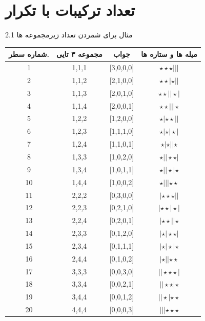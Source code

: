 \documentclass[12pt]{article}
\begin{document}
\section{تعداد ترکیبات با تکرار}
{\large  2.1 مثال برای شمردن تعداد زیرمجموعه ها}

\begin{table}[h]
\centering
\begin{tabular}{|c|c|c|c|}
\hline
شماره سطر. &مجموعه ۳ تایی & جواب & میله ها و ستاره ها \\
\hline
1&{1,1,1} &[3,0,0,0]&$\star \star \star |||$\\
\hline
2 &{1,1,2} &[2,1,0,0] &$\star \star |\star ||$\\
\hline
3&	{1,1,3}&	[2,0,1,0]&	$\star \star ||\star |$\\
\hline
4&	{1,1,4}&	[2,0,0,1]&	$\star \star |||\star$ \\
\hline
5&	{1,2,2}&	[1,2,0,0]&	$\star |\star \star ||$\\
\hline
6&	{1,2,3}&	[1,1,1,0]&	$\star |\star |\star |$\\
\hline
7&	{1,2,4}&	[1,1,0,1]&	$\star |\star ||\star$ \\
\hline
8&	{1,3,3}&	[1,0,2,0]&	$\star ||\star \star |$\\
\hline
9&	{1,3,4}&	[1,0,1,1]& $\star ||\star |\star$ \\
\hline
10&	{1,4,4}&	[1,0,0,2]&	$\star |||\star \star$ \\
\hline
11&	{2,2,2}&	[0,3,0,0]&	$|\star \star \star ||$\\
\hline
12&	{2,2,3}&	[0,2,1,0]&	$|\star \star |\star |$\\
\hline
13&	{2,2,4}&	[0,2,0,1]&	$|\star \star ||\star$ \\
\hline
14&	{2,3,3}&	[0,1,2,0]&	$|\star |\star \star |$\\
\hline
15&	{2,3,4}&	[0,1,1,1]&	$|\star |\star |\star$ \\
\hline
16&	{2,4,4}&	[0,1,0,2]&	$|\star ||\star \star$ \\
\hline
17&	{3,3,3}&	[0,0,3,0]&	$||\star \star \star |$\\
\hline
18&	{3,3,4}&	[0,0,2,1]&	$||\star \star |\star$ \\
\hline
19&	{3,4,4} &	[0,0,1,2]&	$||\star |\star \star$ \\
\hline 
20 &	{4,4,4} &	[0,0,0,3] &$|||\star \star \star$ \\
\hline
\end{tabular}
\end{table}
\lr{\\\\\\\\\\\\}
\end{document}
